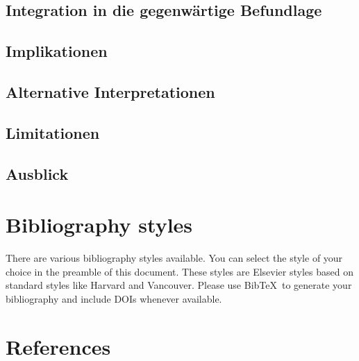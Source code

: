 \documentclass[preprint,12pt]{elsarticle}
\begin{document}
\subsection{Integration in die gegenwärtige Befundlage}

\subsection{Implikationen}

\subsection{Alternative Interpretationen}

\subsection{Limitationen}

\subsection{Ausblick}


\section{Bibliography styles}

There are various bibliography styles available. You can select the style of your choice in the preamble of this document. These styles are Elsevier styles based on standard styles like Harvard and Vancouver. Please use Bib\TeX\ to generate your bibliography and include DOIs whenever available.

\section*{References}


\end{document}
